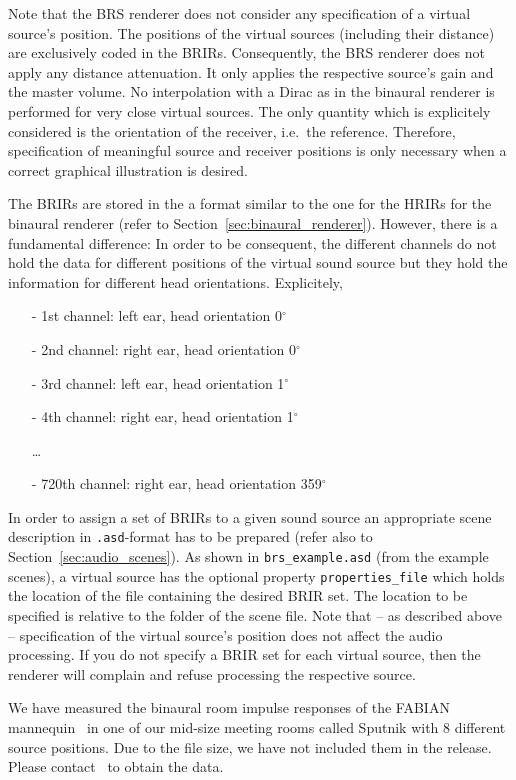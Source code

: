 Note that the BRS renderer does not consider any specification of a virtual
source's position. The positions of the virtual sources (including their
distance) are exclusively coded in the BRIRs. Consequently, the BRS renderer
does not apply any distance attenuation. It only applies the respective
source's gain and the master volume. No interpolation with a Dirac as in the
binaural renderer is performed for very close virtual sources. The only
quantity which is explicitely considered is the orientation of the receiver,
i.e.~the reference. Therefore, specification of meaningful source and receiver
positions is only necessary when a correct graphical illustration is desired.

The BRIRs are stored in the a format similar to the one for the HRIRs for the
binaural renderer (refer to Section~\ref{sec:binaural_renderer}). However,
there is a fundamental difference: In order to be consequent, the different
channels do not hold the data for different positions of the virtual sound
source but they hold the information for different head orientations.
Explicitely,
%
\begin{itemize}
\item[-] 1st channel: left ear, head orientation 0$^\circ$
\item[-] 2nd channel: right ear, head orientation 0$^\circ$
\item[-] 3rd channel: left ear, head orientation 1$^\circ$
\item[-] 4th channel: right ear, head orientation 1$^\circ$
\item[] \dots
\item[-] 720th channel: right ear, head orientation 359$^\circ$
\end{itemize}
%
In order to assign a set of BRIRs to a given sound source an appropriate scene
description in \texttt{.asd}-format has to be prepared (refer also to
Section~\ref{sec:audio_scenes}). As shown in \texttt{brs\_example.asd} (from
the example scenes), a virtual source has the optional property
\texttt{properties\_file} which holds the location of the file containing the
desired BRIR set. The location to be specified is relative to the folder of the
scene file. Note that -- as described above -- specification of the virtual
source's position does not affect the audio processing. If you do not specify a
BRIR set for each virtual source, then the renderer will complain and refuse
processing the respective source.

We have measured the binaural room impulse responses of the FABIAN
mannequin~\cite{fabian} in one of our mid-size meeting rooms called Sputnik
with 8 different source positions. Due to the file size, we have not included
them in the release. Please contact \contactadress\ to obtain the data.


